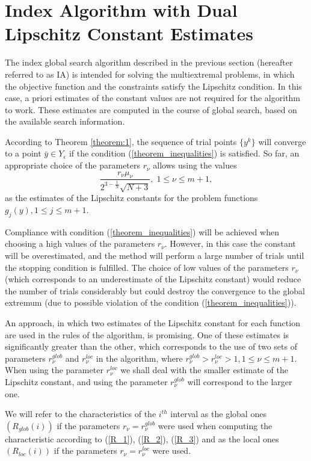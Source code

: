 \documentclass[twocolumn]{svjour3}          %
\begin{document}
\section{Index Algorithm with Dual Lipschitz Constant Estimates}
\label{sec:4}
	The index global search algorithm described in the previous section (hereafter referred to as IA) is intended for solving  the multiextremal problems, in which the objective function and the constraints satisfy the Lipschitz condition.  In this case, a priori estimates of the constant values are not required for the algorithm to work. These estimates are computed in the course of global search, based on the available search information. 
	
	According to Theorem \ref{theorem:1}, the sequence of trial points $\{y^k\}$ will converge to a point $\bar y \in Y_\epsilon$ if the condition (\ref{theorem_inequalities}) is satisfied. So far, an appropriate choice of the parameters $r_{\nu}$ allows using the values
\begin{equation}\label{estimates_Lipschitz_constants}
	\frac{r_{\nu}\mu_{\nu}}{2^{3-\frac{1}{N}}\sqrt{N+3}}, \; 1 \leq \nu \leq m+1, 
\end{equation}
as the estimates of the Lipschitz constants for the problem functions $g_{j}(y), 1 \leq j \leq m+1$.

	Compliance with condition (\ref{theorem_inequalities}) will be achieved when choosing a high values of the parameters $r_{\nu}$. However, in this case the constant will be overestimated, and the method will perform a large number of trials until the stopping condition is fulfilled.
	The choice of low values of the parameters $r_{\nu}$ (which corresponds to an underestimate of the Lipschitz constant) would reduce the number of trials considerably but could destroy the convergence to the global extremum (due to possible violation of the condition (\ref{theorem_inequalities})).
	
	An approach, in which two estimates of the Lipschitz constant for each function are used in the rules of the algorithm, is promising. One of these estimates is significantly greater than the other, which corresponds to the use of two sets of parameters $r_{\nu}^{glob}$ and $r_{\nu}^{loc}$ in the algorithm, where $r_{\nu}^{glob}>r_{\nu}^{loc}>1, 1 \leq \nu \leq m+1$. When using the parameter $r_{\nu}^{loc}$ we shall deal with the smaller estimate of the Lipschitz constant, and using the parameter $r_{\nu}^{glob}$ will correspond to the larger one.
	
	We will refer to the characteristics of the $i^{th}$ interval as the global ones $(R_{glob}(i))$ if the parameters $r_{\nu}=r_{\nu}^{glob}$ were used when computing the characteristic according to (\ref{R_1}), (\ref{R_2}), (\ref{R_3}) and as the local ones  $(R_{loc}(i))$ if the parameters $r_{\nu}=r_{\nu}^{loc}$ were used. 
\end{document}
